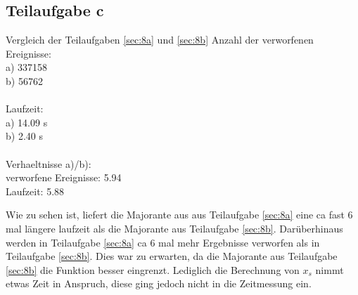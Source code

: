 \subsection{Teilaufgabe c} \label{sec:8c}
\begin{console1}{Vergleich der Teilaufgaben \ref{sec:8a} und \ref{sec:8b}}
  Anzahl der verworfenen Ereignisse: \\
  a) 337158 \\
  b) 56762 \\
  \\
  Laufzeit: \\
  a) 14.09 s \\
  b) 2.40 s \\
  \\
  Verhaeltnisse a)/b): \\
  verworfene Ereignisse: 5.94 \\
  Laufzeit: 5.88 \\
\end{console1}
Wie zu sehen ist, liefert die Majorante aus aus Teilaufgabe \ref{sec:8a} eine ca fast 6 mal längere laufzeit als die Majorante aus Teilaufgabe \ref{sec:8b}.
Darüberhinaus werden in Teilaufgabe \ref{sec:8a} ca 6 mal mehr Ergebnisse verworfen als in Teilaufgabe \ref{sec:8b}.
Dies war zu erwarten, da die Majorante aus Teilaufgabe \ref{sec:8b} die Funktion besser eingrenzt.
Lediglich die Berechnung von $x_s$ nimmt etwas Zeit in Anspruch, diese ging jedoch nicht in die Zeitmessung ein.
